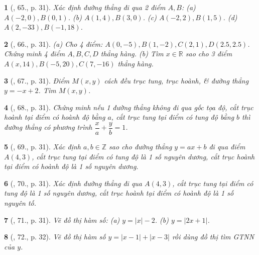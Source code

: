 \documentclass{article}
\newtheorem{baitoan}{}
\begin{document}
\begin{baitoan}[\cite{Binh_Toan_9_tap_1}, 65., p. 31]
	Xác định đường thẳng đi qua 2 điểm $A,B$: (a) $A(-2,0),B(0,1)$. (b) $A(1,4),B(3,0)$. (c) $A(-2,2),B(1,5)$. (d) $A(2,-33),B(-1,18)$.
\end{baitoan}

\begin{baitoan}[\cite{Binh_Toan_9_tap_1}, 66., p. 31]
	(a) Cho 4 điểm: $A(0,-5),B(1,-2),C(2,1),D(2.5,2.5)$. Chứng minh 4 điểm $A,B,C,D$ thẳng hàng. (b) Tìm $x\in\mathbb{R}$ sao cho 3 điểm $A(x,14),B(-5,20),C(7,-16)$ thẳng hàng.
\end{baitoan}

\begin{baitoan}[\cite{Binh_Toan_9_tap_1}, 67., p. 31]
	Điểm $M(x,y)$ cách đều trục tung, trục hoành, \& đường thẳng $y = -x + 2$. Tìm $M(x,y)$.
\end{baitoan}

\begin{baitoan}[\cite{Binh_Toan_9_tap_1}, 68., p. 31]
	Chứng minh nếu 1 đường thẳng không đi qua gốc tọa độ, cắt trục hoành tại điểm có hoành độ bằng $a$, cắt trục tung tại điểm có tung độ bằng $b$ thì đường thẳng có phương trình $\dfrac{x}{a} + \dfrac{y}{b} = 1$.
\end{baitoan}

\begin{baitoan}[\cite{Binh_Toan_9_tap_1}, 69., p. 31]
	Xác định $a,b\in\mathbb{Z}$ sao cho đường thẳng $y = ax + b$ đi qua điểm $A(4,3)$, cắt trục tung tại điểm có tung độ là 1 số nguyên dương, cắt trục hoành tại điểm có hoành độ là 1 số nguyên dương.
\end{baitoan}

\begin{baitoan}[\cite{Binh_Toan_9_tap_1}, 70., p. 31]
	Xác định đường thẳng đi qua $A(4,3)$, cắt trục tung tại điểm có tung độ là 1 số nguyên dương, cắt trục hoành tại điểm có hoành độ là 1 số nguyên tố.
\end{baitoan}

\begin{baitoan}[\cite{Binh_Toan_9_tap_1}, 71., p. 31]
	Vẽ đồ thị hàm số: (a) $y = |x| - 2$. (b) $y = |2x + 1|$.
\end{baitoan}

\begin{baitoan}[\cite{Binh_Toan_9_tap_1}, 72., p. 32]
	Vẽ đồ thị hàm số $y = |x - 1| + |x - 3|$ rồi dùng đồ thị tìm {\rm GTNN} của $y$.
\end{baitoan}
\end{document}
